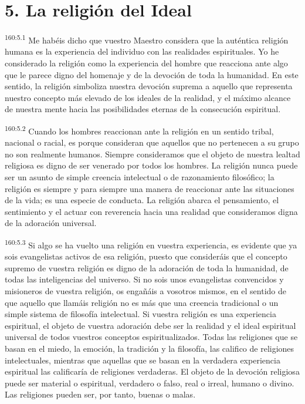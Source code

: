\section*{5. La religión del Ideal}
\par
\textsuperscript{160:5.1} Me habéis dicho que vuestro Maestro considera que la auténtica religión humana es la experiencia del individuo con las realidades espirituales. Yo he considerado la religión como la experiencia del hombre que reacciona ante algo que le parece digno del homenaje y de la devoción de toda la humanidad. En este sentido, la religión simboliza nuestra devoción suprema a aquello que representa nuestro concepto más elevado de los ideales de la realidad, y el máximo alcance de nuestra mente hacia las posibilidades eternas de la consecución espiritual.

\par
\textsuperscript{160:5.2} Cuando los hombres reaccionan ante la religión en un sentido tribal, nacional o racial, es porque consideran que aquellos que no pertenecen a su grupo no son realmente humanos. Siempre consideramos que el objeto de nuestra lealtad religiosa es digno de ser venerado por todos los hombres. La religión nunca puede ser un asunto de simple creencia intelectual o de razonamiento filosófico; la religión es siempre y para siempre una manera de reaccionar ante las situaciones de la vida; es una especie de conducta. La religión abarca el pensamiento, el sentimiento y el actuar con reverencia hacia una realidad que consideramos digna de la adoración universal.

\par
\textsuperscript{160:5.3} Si algo se ha vuelto una religión en vuestra experiencia, es evidente que ya sois evangelistas activos de esa religión, puesto que consideráis que el concepto supremo de vuestra religión es digno de la adoración de toda la humanidad, de todas las inteligencias del universo. Si no sois unos evangelistas convencidos y misioneros de vuestra religión, os engañáis a vosotros mismos, en el sentido de que aquello que llamáis religión no es más que una creencia tradicional o un simple sistema de filosofía intelectual. Si vuestra religión es una experiencia espiritual, el objeto de vuestra adoración debe ser la realidad y el ideal espiritual universal de todos vuestros conceptos espiritualizados. Todas las religiones que se basan en el miedo, la emoción, la tradición y la filosofía, las califico de religiones intelectuales, mientras que aquellas que se basan en la verdadera experiencia espiritual las calificaría de religiones verdaderas. El objeto de la devoción religiosa puede ser material o espiritual, verdadero o falso, real o irreal, humano o divino. Las religiones pueden ser, por tanto, buenas o malas.

